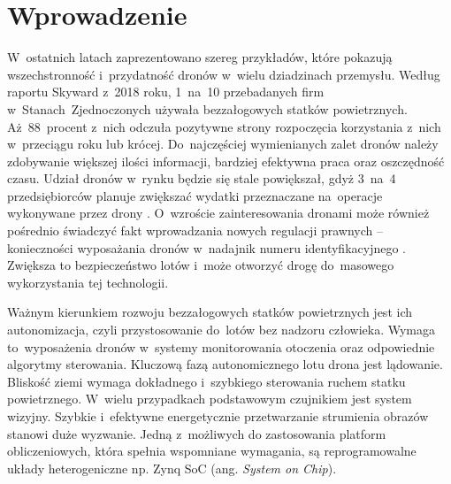 \chapter{Wprowadzenie}
\label{cha:wprowadzenie}



W~ostatnich latach zaprezentowano szereg przykładów, które pokazują wszechstronność i~przydatność dronów w~wielu dziadzinach przemysłu. 
Według raportu Skyward z~2018 roku, 1~na~10 przebadanych firm w~Stanach~Zjednoczonych używała bezzałogowych statków powietrznych. 
Aż~88~procent z~nich odczuła pozytywne strony rozpoczęcia korzystania z~nich w~przeciągu roku lub krócej. 
Do~najczęściej wymienianych zalet dronów należy zdobywanie większej ilości informacji, bardziej efektywna praca oraz oszczędność czasu. 
Udział dronów w~rynku będzie się stale powiększał, gdyż 3~na~4 przedsiębiorców planuje zwiększać wydatki przeznaczane na~operacje wykonywane przez drony \cite{skyward}. 
O~wzroście zainteresowania dronami może również pośrednio świadczyć fakt wprowadzania nowych regulacji prawnych -- konieczności wyposażania dronów w~nadajnik numeru identyfikacyjnego \cite{drone_article}. 
Zwiększa to bezpieczeństwo lotów i~może otworzyć drogę do~masowego wykorzystania tej technologii.\par

Ważnym kierunkiem rozwoju bezzałogowych statków powietrznych jest ich autonomizacja, czyli przystosowanie do~lotów bez nadzoru człowieka. 
Wymaga to~wyposażenia dronów w~systemy monitorowania otoczenia oraz odpowiednie algorytmy sterowania.
Kluczową fazą autonomicznego lotu drona jest lądowanie. 
Bliskość ziemi wymaga dokładnego i~szybkiego sterowania ruchem statku powietrznego.
W~wielu przypadkach podstawowym czujnikiem jest system wizyjny.
Szybkie i~efektywne energetycznie przetwarzanie strumienia obrazów stanowi duże wyzwanie.
Jedną z~możliwych do zastosowania platform obliczeniowych, która spełnia wspomniane wymagania, są reprogramowalne układy heterogeniczne np. Zynq SoC (ang. \textit{System on Chip}).


